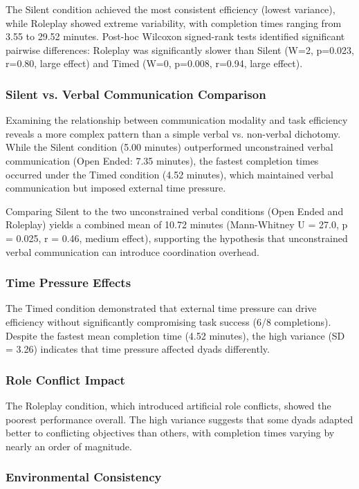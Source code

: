 The Silent condition achieved the most consistent efficiency (lowest variance), while Roleplay showed extreme variability, with completion times ranging from 3.55 to 29.52 minutes. Post-hoc Wilcoxon signed-rank tests identified significant pairwise differences: Roleplay was significantly slower than Silent (W=2, p=0.023, r=0.80, large effect) and Timed (W=0, p=0.008, r=0.94, large effect).

\subsubsection{Silent vs. Verbal Communication Comparison}

Examining the relationship between communication modality and task efficiency reveals a more complex pattern than a simple verbal vs. non-verbal dichotomy. While the Silent condition (5.00 minutes) outperformed unconstrained verbal communication (Open Ended: 7.35 minutes), the fastest completion times occurred under the Timed condition (4.52 minutes), which maintained verbal communication but imposed external time pressure.

Comparing Silent to the two unconstrained verbal conditions (Open Ended and Roleplay) yields a combined mean of 10.72 minutes (Mann-Whitney U = 27.0, p = 0.025, r = 0.46, medium effect), supporting the hypothesis that unconstrained verbal communication can introduce coordination overhead.

\subsubsection{Time Pressure Effects}
The Timed condition demonstrated that external time pressure can drive efficiency without significantly compromising task success (6/8 completions). Despite the fastest mean completion time (4.52 minutes), the high variance (SD = 3.26) indicates that time pressure affected dyads differently.

\subsubsection{Role Conflict Impact}

The Roleplay condition, which introduced artificial role conflicts, showed the poorest performance overall. The high variance suggests that some dyads adapted better to conflicting objectives than others, with completion times varying by nearly an order of magnitude.

\subsubsection{Environmental Consistency}\label{sec:environments}

